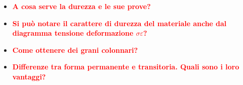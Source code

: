 \documentclass[a4paper, 15pt]{article}
\begin{document}
\begin{itemize}
	
	
\item
	\textcolor{red}{\textbf{A cosa serve la durezza e le sue prove?}}\\
	
	
	
	
\item
	\textcolor{red}{\textbf{Si può notare il carattere di durezza del materiale anche dal diagramma tensione deformazione $\sigma\varepsilon$?}}\\
		
		
		
		
		
		
\item
		\textcolor{red}{\textbf{Come ottenere dei grani colonnari?}}\\
		
		
		
		
		
\item
		\textcolor{red}{\textbf{Differenze tra forma permanente e transitoria. Quali sono i loro vantaggi?}}\\
		

\end{itemize}
\end{document}
